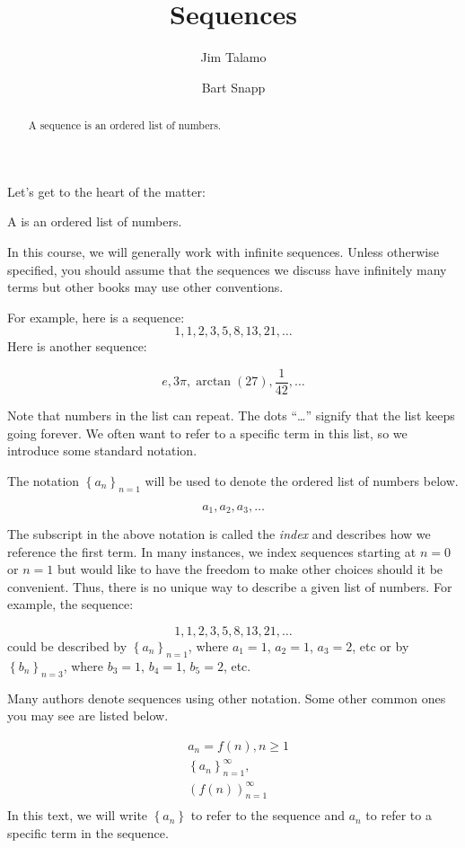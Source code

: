 \documentclass{ximera}
\author{Jim Talamo \and Bart Snapp}
\title[Dig-In:]{Sequences}
\begin{document}
\begin{abstract}
  A sequence is an ordered list of numbers.
\end{abstract}
\maketitle

Let's get to the heart of the matter:

\begin{definition}
  A  is an ordered list of numbers.
\end{definition}

In this course, we will generally work with infinite sequences.  Unless otherwise specified, you should assume that the sequences we discuss have infinitely many terms but other books may use other conventions.

For example, here is a sequence:
\[
1,1, 2, 3, 5, 8, 13, 21, \ldots
\]
Here is another sequence:

\[
e, 3\pi, \arctan(27), \frac{1}{42}, \ldots
\]


Note that numbers in the list can repeat.  The dots ``\ldots'' signify that the list keeps going forever.  We often want to refer to a specific term in this list, so we introduce some standard notation.
\begin{definition} The notation $\left\{a_n\right\}_{n=1}$ will be used to denote the ordered list of numbers below.

\[
a_1, a_2,  a_3, \ldots
\]
\end{definition}

The subscript in the above notation is called the \emph{index} and describes how we reference the first term.  In many instances, we index sequences starting at $n=0$ or $n=1$ but would like to have the freedom to make other choices should it be convenient.  Thus, there is no unique way to describe a given list of numbers.  For example, the sequence:

\[
1,1, 2, 3, 5, 8, 13, 21, \ldots
\]
could be described by $\left\{a_n\right\}_{n=1}$, where $a_1=1$, $a_2=1$, $a_3=2$, etc or by  $\left\{b_n\right\}_{n=3}$, where $b_3=1$, $b_4=1$, $b_5=2$, etc.

\begin{remark}
Many authors denote sequences using other notation.  Some other common ones you may see are listed below. 

\begin{align*}
  &a_n = f(n), n \geq 1   \\
  & \left\{a_n\right\}_{n=1}^\infty, \\
  & \left(f(n)\right)_{n=1}^\infty \\
\end{align*}
In this text, we will write $\left\{a_n\right\}$ to refer to the sequence and $a_n$ to refer to a specific term in the sequence.

\end{remark}
\end{document}

